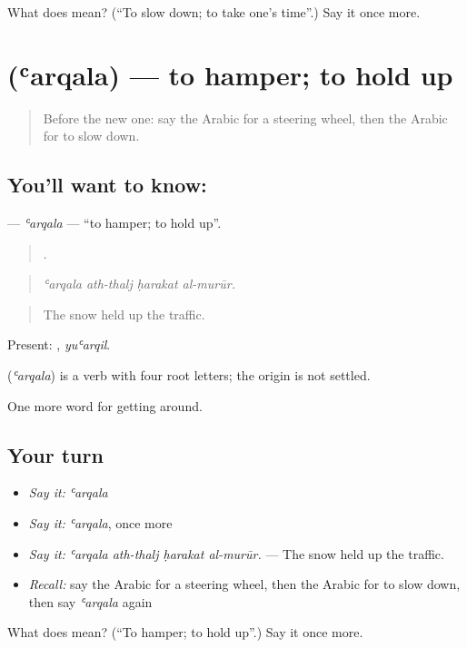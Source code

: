 \begin{tcolorbox}[breakable,colback=teal!4,colframe=teal!35!black,title={Before you move on}]
What does  mean? (\textquotedblleft{}To slow down; to take one's time\textquotedblright{}.) Say it once more.
\end{tcolorbox}
\section[\texorpdfstring{\ar{عرقل} (ʿarqala)}{عرقل (ʿarqala)}]{ (ʿarqala) — to hamper; to hold up}

\label{lesson:AR-C445-arqala}



\begin{quote}
Before the new one: say the Arabic for a steering wheel, then the Arabic for to slow down.
\end{quote}

\subsection*{You'll want to know: }
\textbf{} — \emph{ʿarqala} — \textquotedblleft{}to hamper; to hold up\textquotedblright{}.

\begin{quote}
   .
\end{quote}

\begin{quote}
\emph{ʿarqala ath-thalj ḥarakat al-murūr.}
\end{quote}

\begin{quote}
The snow held up the traffic.
\end{quote}

Present: , \emph{yuʿarqil}.

\begin{cousinweb}
\textbf{} (\emph{ʿarqala}) is a verb with four root letters; the origin is not settled.
\end{cousinweb}

\begin{grammarlens}[title={What you've built}]
One more word for getting around.
\end{grammarlens}

\subsection*{Your turn}
\begin{itemize}
\raggedright
  \item \emph{Say it:} \emph{ʿarqala}
  \item \emph{Say it:} \emph{ʿarqala}, once more
  \item \emph{Say it:} \emph{ʿarqala ath-thalj ḥarakat al-murūr.} — The snow held up the traffic.
  \item \emph{Recall:} say the Arabic for a steering wheel, then the Arabic for to slow down, then say \emph{ʿarqala} again
\end{itemize}

\begin{tcolorbox}[breakable,colback=teal!4,colframe=teal!35!black,title={Before you move on}]
What does  mean? (\textquotedblleft{}To hamper; to hold up\textquotedblright{}.) Say it once more.
\end{tcolorbox}
